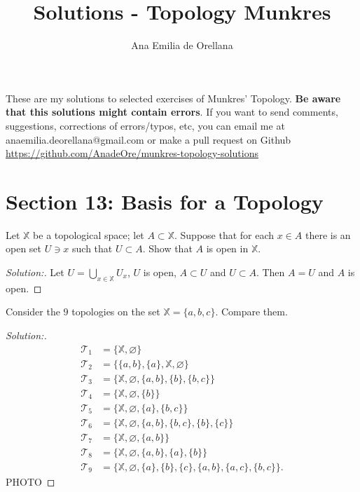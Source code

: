 \documentclass[a4paper,12pt, reqno]{article}
\title{Solutions - Topology Munkres}
\author{\small Ana Emilia de Orellana}
\date{}
\theoremstyle{definition}
\newenvironment{exerr}[1]{
  \renewcommand\theexeralt{#1}
  \exeralt
}{\endexeralt}
\newenvironment{solution}{\begin{proof}[Solution:]}{\end{proof}}
\newcommand{\T}{\mathscr{T}}
\newcommand{\X}{\mathbb{X}}
\begin{document}
\maketitle

These are my solutions to selected exercises of Munkres' Topology. \textbf{Be aware that this solutions might contain errors}. If you want to send comments, suggestions, corrections of errors/typos, etc, you can email me at anaemilia.deorellana@gmail.com or make a pull request on Github \url{https://github.com/AnadeOre/munkres-topology-solutions}

\tableofcontents

\section*{Section 13: Basis for a Topology}

\begin{exerr}{1}
  Let $\X$ be a topological space; let $A\subset\X$. Suppose that for each $x\in A$ there is an open set $U\ni x$ such that $U\subset A$. Show that $A$ is open in $\X$.
\end{exerr}
\begin{solution}
  Let $U = \bigcup_{x\in\X} U_{x}$, $U$ is open, $A\subset U$ and $U\subset A$. Then $A=U$ and $A$ is open.
\end{solution}

\begin{exerr}{2}
  Consider the $9$ topologies on the set $\X = \{ a,b,c \}$. Compare them.
\end{exerr}
\begin{solution}
  \begin{align*}
    \T_{1} & = \{ \X,\varnothing \}                                                         \\
    \T_{2} & = \{ \{ a,b \},\{ a\},\X,\varnothing \}                                        \\
    \T_{3} & = \{ \X,\varnothing, \{ a,b \},\{ b \},\{ b,c \} \}                            \\
    \T_{4} & = \{ \X,\varnothing, \{ b \} \}                                                \\
    \T_{5} & = \{ \X,\varnothing, \{ a \},\{ b,c \} \}                                      \\
    \T_{6} & = \{ \X,\varnothing,\{ a,b \},\{ b,c \},\{ b \},\{ c \} \}                     \\
    \T_{7} & = \{ \X, \varnothing, \{ a,b \} \}                                             \\
    \T_{8} & = \{ \X,\varnothing, \{ a,b \},\{ a \},\{ b \} \}                              \\
    \T_{9} & = \{ \X,\varnothing, \{ a \},\{ b \},\{ c \},\{ a,b \},\{ a,c \},\{ b,c \} \}.
  \end{align*}
  PHOTO
\end{solution}
\end{document}

